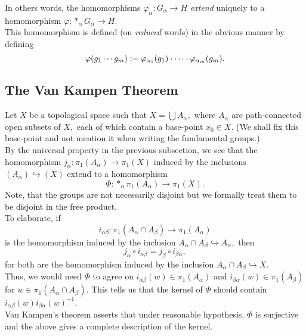\documentclass[12pt]{article}
\theoremstyle{definition}
\numberwithin{thm}{section}
\begin{document}
In others words, the homomorphisms $\varphi_\alpha:G_\alpha \to H$ \emph{extend} uniquely to a homomorphism $\varphi:*_\alpha G_\alpha \to H.$\\
This homomorphism is defined (on \emph{reduced} words) in the obvious manner by defining
\begin{equation*} 
	\varphi(g_1\cdots g_m) \vcentcolon= \varphi_{\alpha_1}(g_1)\cdot\cdots\cdot\varphi_{\alpha_m}(g_m).
\end{equation*}
%
%
%
\subsection{The Van Kampen Theorem}
Let $X$ be a topological space such that $X = \bigcup A_\alpha,$ where $A_\alpha$ are path-connected open subsets of $X,$ each of which contain a base-point $x_0 \in X.$ (We shall fix this base-point and not mention it when writing the fundamental groups.) \\
By the universal property in the previous subsection, we see that the homomorphism $j_\alpha:\pi_1(A_\alpha) \to \pi_1(X)$ induced by the inclusions $(A_\alpha) \hookrightarrow (X)$ extend to a homomorphism
\begin{equation*} 
	\Phi:*_\alpha\pi_1(A_\alpha) \to \pi_1(X).
\end{equation*}
Note, that the groups are not necessarily disjoint but we formally treat them to be disjoint in the free product.\\
To elaborate, if
\begin{equation*} 
	i_{\alpha\beta}:\pi_1(A_\alpha \cap A_\beta) \to \pi_1(A_\alpha)
\end{equation*}
is the homomorphism induced by the inclusion $A_\alpha\cap A_\beta \hookrightarrow A_\alpha,$ then
\begin{equation*} 
	j_{\alpha}\circ i_{\alpha\beta} = j_\beta\circ i_{\beta\alpha},
\end{equation*}
for both are the homomorphism induced by the inclusion $A_\alpha\cap A_\beta \hookrightarrow X.$\\
Thus, we would need $\Phi$ to agree on $i_{\alpha\beta}(w) \in \pi_1(A_\alpha)$ and $i_{\beta\alpha}(w) \in \pi_1(A_\beta)$ for $w \in \pi_1(A_\alpha\cap A_\beta).$ This tells us that the kernel of $\Phi$ should contain $i_{\alpha\beta}(w)i_{\beta\alpha}(w)^{-1}.$\\
Van Kampen's theorem asserts that under reasonable hypothesis, $\Phi$ is surjective and the above gives a complete description of the kernel.
\end{document}
